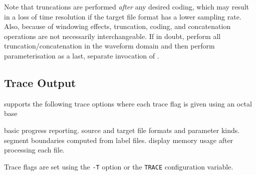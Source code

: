 Note that truncations are performed {\em after\/} any desired coding,
which may result in a loss of time resolution if the target file format
has a lower sampling rate. Also, because of windowing effects,
truncation, coding, and concatenation operations are not necessarily
interchangeable.  If in doubt, perform all truncation/concatenation in
the waveform domain and then perform parameterisation as a last, separate
invocation of .

\subsection{Trace Output}

 supports the following trace options where each
trace flag is given using an octal base
\begin{optlist}

  basic progress reporting. 
  source and target file formats and parameter kinds.
  segment boundaries computed from label files.
  display memory usage after processing each file.
\end{optlist}
Trace flags are set using the \texttt{-T} option or the  \texttt{TRACE} 
configuration variable.



